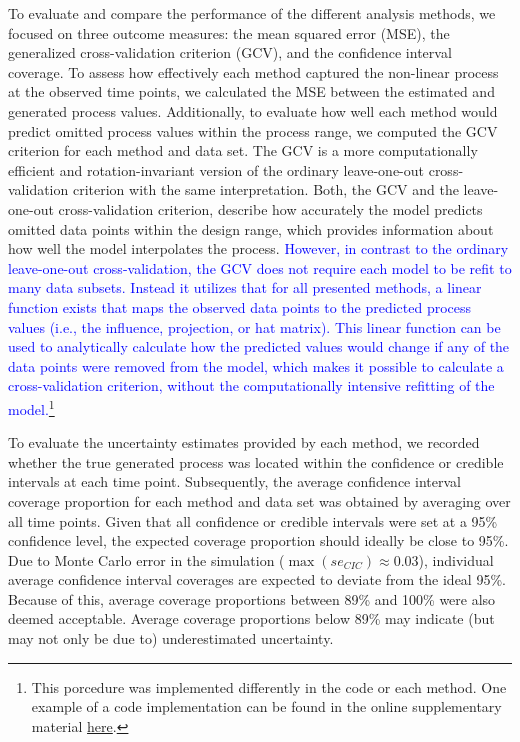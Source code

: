\documentclass[man, floatsintext]{apa7}
\begin{document}
To evaluate and compare the performance of the different analysis methods, we
focused on three outcome measures: the mean squared error (MSE), the
generalized cross-validation criterion (GCV), and the confidence interval
coverage. To assess how effectively each method captured the non-linear process
at the observed time points, we calculated the MSE between the estimated and
generated process values. Additionally, to evaluate how well each method would
predict omitted process values within the process range, we computed the GCV
\parencite{golub_generalized_1979} criterion for each method and data set. The
GCV is a more computationally efficient and rotation-invariant version of the
ordinary leave-one-out cross-validation criterion with the same interpretation.
Both, the GCV and the leave-one-out cross-validation criterion, describe how
accurately the model predicts omitted data points within the design range,
which provides information about how well the model interpolates the process.
\textcolor{blue}{However, in contrast to the ordinary leave-one-out
  cross-validation, the GCV does not require each model to be refit to many
  data
  subsets. Instead it utilizes that for all presented methods, a linear
  function
  exists that maps the observed data points to the predicted process values
  (i.e., the influence, projection, or hat matrix). This linear function can be
  used to analytically calculate how the predicted values would change if any
  of
  the data points were removed from the model, which makes it possible to
  calculate a cross-validation criterion, without the computationally intensive
  refitting of the model.\footnote{This porcedure was implemented differently
    in the code or each method. One example of a code implementation can
    be found in the online supplementary material
    \href{https://shorturl.at/Lhv9N}{here}.
  }
}

To evaluate the uncertainty estimates provided by each method, we recorded
whether the true generated process was located within the confidence or
credible intervals at each time point. Subsequently, the average confidence
interval coverage proportion for each method and data set was obtained by
averaging over all time points. Given that all confidence or credible intervals
were set at a 95\% confidence level, the expected coverage proportion should
ideally be close to 95\%. Due to Monte Carlo error in the simulation
($\max(se_{CIC}) \approx 0.03$), individual average confidence interval
coverages are expected to deviate from the ideal 95\%. Because of this, average
coverage proportions between 89\% and 100\% were also deemed acceptable.
Average coverage proportions below 89\% may indicate (but may not only be due
to) underestimated uncertainty.
\end{document}
